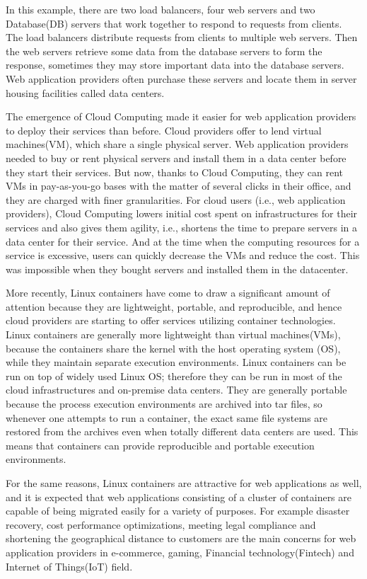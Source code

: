 In this example, there are two load balancers, four web servers and two Database(DB) servers that work together to respond to requests from clients.
The load balancers distribute requests from clients to multiple web servers. 
Then the web servers retrieve some data from the database servers to form the response, sometimes they may store important data into the database servers.
Web application providers often purchase these servers and locate them in server housing facilities called data centers.

The emergence of Cloud Computing made it easier for web application providers to deploy their services than before.
Cloud providers offer to lend virtual machines(VM), which share a single physical server.
Web application providers needed to buy or rent physical servers and install them in a data center before they start their services.
But now, thanks to Cloud Computing, they can rent VMs in pay-as-you-go bases with the matter of several clicks in their office, and they are charged with finer granularities.
For cloud users (i.e., web application providers), Cloud Computing lowers initial cost spent on infrastructures for their services and also gives them agility, i.e., shortens the time to prepare servers in a data center for their service.
And at the time when the computing resources for a service is excessive, users can quickly decrease the VMs and reduce the cost.
This was impossible when they bought servers and installed them in the datacenter.

More recently, Linux containers\cite{menage2007adding} have come to draw a significant amount of attention because they are lightweight, portable, and reproducible, and hence cloud providers are starting to offer services utilizing container technologies.
Linux containers are generally more lightweight than virtual machines(VMs), because the containers share the kernel with the host operating system (OS), while they maintain separate execution environments.
Linux containers can be run on top of widely used Linux OS; therefore they can be run in most of the cloud infrastructures and on-premise data centers.
They are generally portable because the process execution environments are archived into tar files,
so whenever one attempts to run a container, the exact same file systems are restored from the archives even when totally different data centers are used.
This means that containers can provide reproducible and portable execution environments.

For the same reasons, Linux containers are attractive for web applications as well, and it is expected that web applications consisting of a cluster of containers are capable of being migrated easily for a variety of purposes.
For example disaster recovery, cost performance optimizations, meeting legal compliance and shortening the geographical distance to customers are the main concerns for web application providers in e-commerce, gaming, Financial technology(Fintech) and Internet of Things(IoT) field.

